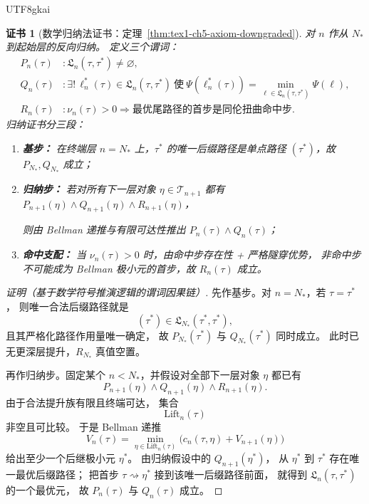 \documentclass[12pt]{article}
\newtheorem{Certificate}{证书}[section]
\begin{document}
\begin{CJK*}{UTF8}{gkai}
\begin{Certificate}[数学归纳法证书：定理~\ref{thm:tex1-ch5-axiom-downgraded}]
\label{cert:tex1-ch5-axiom-downgraded}
对 \(n\) 作从 \(N_\ast\) 到起始层的反向归纳。
定义三个谓词：
\[
\begin{aligned}
  P_n(\tau) &: \mathfrak L_n(\tau,\tau^\ast)\neq\varnothing,\\
  Q_n(\tau) &: \exists!\,\ell_n^\ast(\tau)\in\mathfrak L_n(\tau,\tau^\ast)
              \ \text{使}\
              \Psi(\ell_n^\ast(\tau))
              =
              \min_{\ell\in\mathfrak L_n(\tau,\tau^\ast)}\Psi(\ell),\\
  R_n(\tau) &: \nu_n(\tau)>0
              \Rightarrow
              \text{最优尾路径的首步是同伦扭曲命中步}.
\end{aligned}
\]
归纳证书分三段：
\begin{enumerate}
  \item \textbf{基步：} 在终端层 \(n=N_\ast\) 上，\(\tau^\ast\) 的唯一后缀路径是单点路径 \((\tau^\ast)\)，故 \(P_{N_\ast},Q_{N_\ast}\) 成立；
  \item \textbf{归纳步：} 若对所有下一层对象 \(\eta\in\mathcal T_{n+1}\) 都有 \(P_{n+1}(\eta)\wedge Q_{n+1}(\eta)\wedge R_{n+1}(\eta)\)，

  则由 Bellman 递推与有限可达性推出 \(P_n(\tau)\wedge Q_n(\tau)\)；
  \item \textbf{命中支配：} 当 \(\nu_n(\tau)>0\) 时，由命中步存在性 + 严格隧穿优势，
  非命中步不可能成为 Bellman 极小元的首步，故 \(R_n(\tau)\) 成立。
\end{enumerate}
\end{Certificate}

\begin{proof}[证明（基于数学符号推演逻辑的谓词因果链）]
先作基步。对 \(n=N_\ast\)，若 \(\tau=\tau^\ast\)，
则唯一合法后缀路径就是
\[
  (\tau^\ast)\in \mathfrak L_{N_\ast}(\tau^\ast,\tau^\ast),
\]
且其严格化路径作用量唯一确定，
故 \(P_{N_\ast}(\tau^\ast)\) 与 \(Q_{N_\ast}(\tau^\ast)\) 同时成立。
此时已无更深层提升，\(R_{N_\ast}\) 真值空置。

再作归纳步。固定某个 \(n<N_\ast\)，并假设对全部下一层对象 \(\eta\) 都已有
\[
  P_{n+1}(\eta)\wedge Q_{n+1}(\eta)\wedge R_{n+1}(\eta).
\]
由于合法提升族有限且终端可达，
集合
\[
  \mathrm{Lift}_n(\tau)
\]
非空且可比较。
于是 Bellman 递推
\[
  V_n(\tau)
  =
  \min_{\eta\in \mathrm{Lift}_n(\tau)}
  \bigl(c_n(\tau,\eta)+V_{n+1}(\eta)\bigr)
\]
给出至少一个后继极小元 \(\eta^\ast\)。
由归纳假设中的 \(Q_{n+1}(\eta^\ast)\)，
从 \(\eta^\ast\) 到 \(\tau^\ast\) 存在唯一最优后缀路径；
把首步 \(\tau\rightsquigarrow\eta^\ast\) 接到该唯一后缀路径前面，
就得到 \(\mathfrak L_n(\tau,\tau^\ast)\) 的一个最优元，
故 \(P_n(\tau)\) 与 \(Q_n(\tau)\) 成立。


\end{proof}
\end{CJK*}
\end{document}
